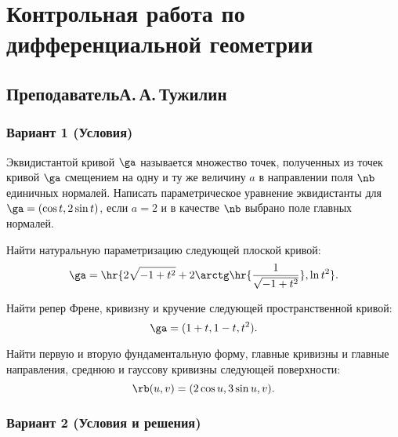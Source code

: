 \documentclass[a4paper]{article}
\begin{document}
\section*{Контрольная работа по дифференциальной геометрии}
\subsection*{Преподаватель\т А.\,А.\,Тужилин}

\subsubsection*{Вариант 1 (Условия)}

\begin{problem}
Эквидистантой кривой $\ga$ называется множество точек, полученных из точек кривой $\ga$ смещением
на одну и ту же величину $a$ в направлении поля $\nb$ единичных нормалей. Написать параметрическое
уравнение эквидистанты для $\ga = (\cos t, 2\sin t)$, если $a = 2$ и в качестве $\nb$ выбрано поле главных нормалей.
\end{problem}

\begin{problem}
Найти натуральную параметризацию следующей плоской кривой:
$$\ga = \hr{ 2\sqrt{-1+t^2} + 2\arctg\hr{\frac{1}{\sqrt{-1+t^2}}}, \ln t^2}.$$
\end{problem}

\begin{problem}
Найти репер Френе, кривизну и кручение следующей пространственной кривой:
$$\ga = (1 + t, 1- t, t^2).$$
\end{problem}

\begin{problem}
Найти первую и вторую фундаментальную форму, главные кривизны и главные направления,
среднюю и гауссову кривизны следующей поверхности:
$$\rb(u,v) = (2\cos u, 3\sin u, v).$$
\end{problem}

\setcounter{problem}{0}

\subsubsection*{Вариант 2 (Условия и решения)}
\end{document}
